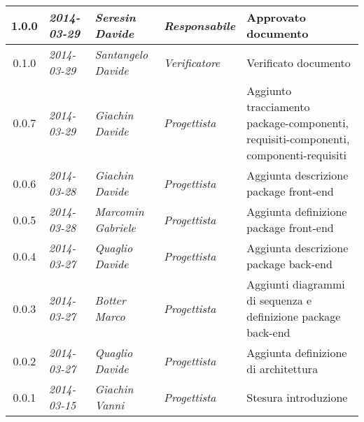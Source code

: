\begin{small}
\begin{tabular}{|c|p{1.8cm}|p{2.8cm}|p{2.8cm}|p{3.5cm}|}
\hline
\hline
1.0.0 & \textit{2014-03-29} & 
\textit{Seresin Davide} &
\textit{Responsabile} &Approvato documento\\
\hline
\hline
0.1.0 & \textit{2014-03-29} & 
\textit{Santangelo Davide} &
\textit{Verificatore} &Verificato documento\\
\hline
\hline
0.0.7 & \textit{2014-03-29} & 
\textit{Giachin Davide} &
\textit{Progettista} & Aggiunto tracciamento package-componenti, requisiti-componenti, componenti-requisiti\\
\hline
\hline
0.0.6 & \textit{2014-03-28} & 
\textit{Giachin Davide} &
\textit{Progettista} & Aggiunta descrizione package front-end\\
\hline
\hline
0.0.5 & \textit{2014-03-28} & 
\textit{Marcomin Gabriele} &
\textit{Progettista} & Aggiunta definizione package front-end\\
\hline
\hline
0.0.4 & \textit{2014-03-27} & 
\textit{Quaglio Davide} &
\textit{Progettista} & Aggiunta descrizione package back-end\\
\hline
\hline
0.0.3 & \textit{2014-03-27} & 
\textit{Botter Marco} &
\textit{Progettista} & Aggiunti diagrammi di sequenza e definizione package back-end\\
\hline
\hline
0.0.2 & \textit{2014-03-27} & 
\textit{Quaglio Davide} &
\textit{Progettista} & Aggiunta definizione di architettura \\
\hline
\hline
0.0.1 & \textit{2014-03-15} & 
\textit{Giachin Vanni} &
\textit{Progettista} & Stesura introduzione\\
\hline
\end{tabular}\\
\end{small}